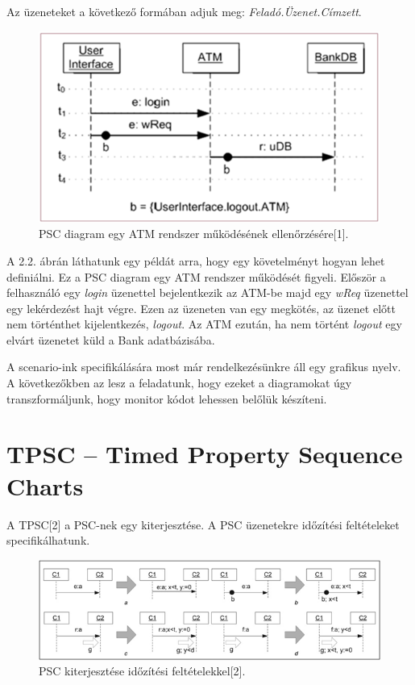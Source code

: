 Az üzeneteket a következő formában adjuk meg: \textit{Feladó.Üzenet.Címzett}.

\begin{figure}[!ht]
    \centering
    \includegraphics[width=130mm, keepaspectratio]{figures/3abra.png}
    \caption{PSC diagram egy ATM rendszer működésének ellenőrzésére[1].}
\end{figure}
A 2.2. ábrán láthatunk egy példát arra, hogy egy követelményt hogyan lehet definiálni.
Ez a PSC diagram egy ATM rendszer működését figyeli.
Először a felhasználó egy \textit{login} üzenettel bejelentkezik az ATM-be majd egy \textit{wReq} üzenettel egy lekérdezést hajt végre.
Ezen az üzeneten van egy megkötés, az üzenet előtt nem történthet kijelentkezés, \textit{logout}.
Az ATM ezután, ha nem történt \textit{logout} egy elvárt üzenetet küld a Bank adatbázisába.

A scenario-ink specifikálására most már rendelkezésünkre áll egy grafikus nyelv.
A következőkben az lesz a feladatunk, hogy ezeket a diagramokat úgy transzformáljunk, hogy monitor kódot lehessen belőlük készíteni.


\clearpage\section{TPSC – Timed Property Sequence Charts}
A TPSC[2] a PSC-nek egy kiterjesztése.
A PSC üzenetekre időzítési feltételeket specifikálhatunk.

\begin{figure}[!ht]
    \centering
    \includegraphics[width=150mm, keepaspectratio]{figures/4abra.png}
    \caption{PSC kiterjesztése időzítési feltételekkel[2].}
\end{figure}

